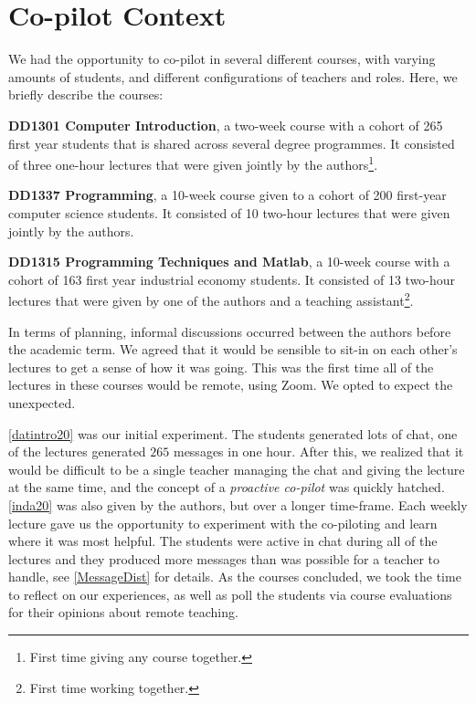 \documentclass[sigconf,natbib=false]{acmart}
\begin{document}
\section{Co-pilot Context}
We had the opportunity to co-pilot in several different courses, with varying amounts of students, and different configurations of teachers and roles. Here, we briefly describe the courses:

\begin{courses}
  \item\label{datintro20} \textbf{DD1301 Computer Introduction}, a two-week 
    course with a cohort of 265 first year students that is shared across 
    several degree programmes. It consisted of three one-hour lectures that 
    were given jointly by the authors\footnote{%
      \label{first-together}First time giving any course together.%
    }.

  \item\label{inda20} \textbf{DD1337 Programming}, a 10-week course given to a 
    cohort of 200 first-year computer science students. It consisted of 10 
    two-hour lectures that were given jointly by the authors.

  \item\label{prgi20} \textbf{DD1315 Programming Techniques and Matlab}, a 
    10-week course with a cohort of 163 first year industrial economy students. 
    It consisted of 13 two-hour lectures that were given by one of the authors 
    and a teaching assistant\footnote{%
      First time working together.%
    }.
\end{courses}

In terms of planning, informal discussions occurred between the authors before 
the academic term. We agreed that it would be sensible to sit-in on each 
other's lectures to get a sense of how it was going. This was the first time 
all of the lectures in these courses would be remote, using Zoom. We opted to 
expect the unexpected.

\ref{datintro20} was our initial experiment. The students generated lots of 
chat, \eg one of the lectures generated $265$ messages in one hour. After this, 
we realized that it would be difficult to be a single teacher managing the chat 
and giving the lecture at the same time, and the concept of a \emph{proactive 
co-pilot} was quickly hatched. \ref{inda20} was also given by the authors, but 
over a longer time-frame. Each weekly lecture gave us the opportunity to 
experiment with the co-piloting and learn where it was most helpful. The 
students were active in chat during all of the lectures and they produced more 
messages than was possible for a teacher to handle, see \cref{MessageDist} 
for details. As the courses concluded, we took the time to reflect on our 
experiences, as well as poll the students via course evaluations for their 
opinions about remote teaching.
\end{document}
